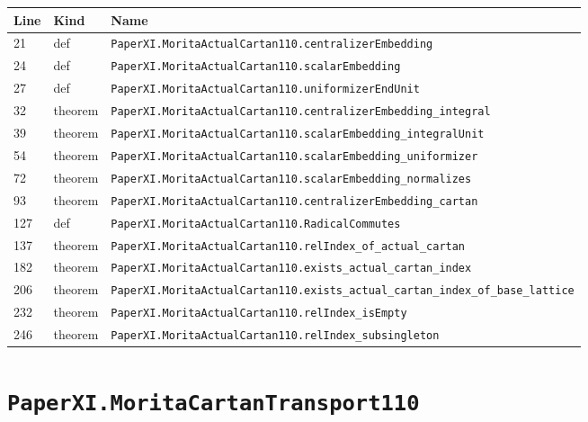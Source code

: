 \documentclass[10pt,oneside]{book}
\begin{document}
\begin{longtable}{@{}p{}p{}p{}@{}}\toprule Line&Kind&Name\\\midrule\endhead

21&def&\nolinkurl{PaperXI.MoritaActualCartan110.centralizerEmbedding}\\

24&def&\nolinkurl{PaperXI.MoritaActualCartan110.scalarEmbedding}\\

27&def&\nolinkurl{PaperXI.MoritaActualCartan110.uniformizerEndUnit}\\

32&theorem&\nolinkurl{PaperXI.MoritaActualCartan110.centralizerEmbedding_integral}\\

39&theorem&\nolinkurl{PaperXI.MoritaActualCartan110.scalarEmbedding_integralUnit}\\

54&theorem&\nolinkurl{PaperXI.MoritaActualCartan110.scalarEmbedding_uniformizer}\\

72&theorem&\nolinkurl{PaperXI.MoritaActualCartan110.scalarEmbedding_normalizes}\\

93&theorem&\nolinkurl{PaperXI.MoritaActualCartan110.centralizerEmbedding_cartan}\\

127&def&\nolinkurl{PaperXI.MoritaActualCartan110.RadicalCommutes}\\

137&theorem&\nolinkurl{PaperXI.MoritaActualCartan110.relIndex_of_actual_cartan}\\

182&theorem&\nolinkurl{PaperXI.MoritaActualCartan110.exists_actual_cartan_index}\\

206&theorem&\nolinkurl{PaperXI.MoritaActualCartan110.exists_actual_cartan_index_of_base_lattice}\\

232&theorem&\nolinkurl{PaperXI.MoritaActualCartan110.relIndex_isEmpty}\\

246&theorem&\nolinkurl{PaperXI.MoritaActualCartan110.relIndex_subsingleton}\\

\bottomrule\end{longtable}

\section{\texorpdfstring{\nolinkurl{PaperXI.MoritaCartanTransport110}}{PaperXI.MoritaCartanTransport110}}\label{module:PaperXI.MoritaCartanTransport110}
\end{document}
